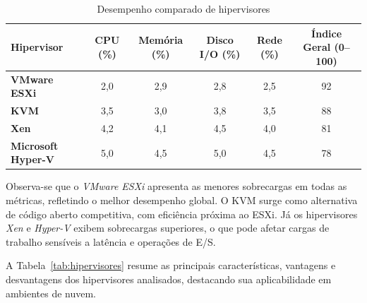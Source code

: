 \begin{table}[htb]
    \centering
    \caption{Desempenho comparado de hipervisores}
    \label{tab:analise-hipervisores}
    \begin{tabularx}{\textwidth}{ >{\bfseries}l c c c c c }
        \toprule
        Hipervisor & CPU (\%) & Memória (\%) & Disco I/O (\%) & Rede (\%) & Índice Geral (0--100) \\
        \midrule
        VMware ESXi & 2,0 & 2,9 & 2,8 & 2,5 & 92 \\
        KVM & 3,5 & 3,0 & 3,8 & 3,5 & 88 \\
        Xen & 4,2 & 4,1 & 4,5 & 4,0 & 81 \\
        Microsoft Hyper-V & 5,0 & 4,5 & 5,0 & 4,5 & 78 \\
        \bottomrule
    \end{tabularx}
\end{table}

Observa-se que o \textit{VMware ESXi} apresenta as menores sobrecargas em todas as métricas, refletindo o melhor desempenho global. O KVM surge como alternativa de código aberto competitiva, com eficiência próxima ao ESXi. Já os hipervisores \textit{Xen} e \textit{Hyper-V} exibem sobrecargas superiores, o que pode afetar cargas de trabalho sensíveis a latência e operações de E/S.


A Tabela~\ref{tab:hipervisores} resume as principais características, vantagens e desvantagens dos hipervisores analisados, destacando sua aplicabilidade em ambientes de nuvem.

